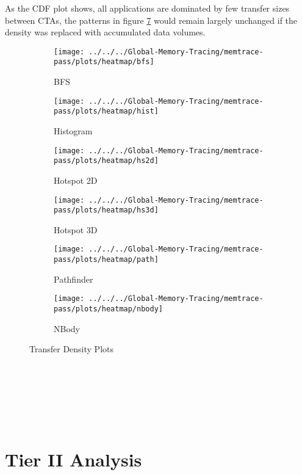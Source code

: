 As the CDF plot shows, all applications are dominated by few transfer sizes between CTAs, the patterns in figure \ref{fig:density-plots} would remain largely unchanged if the density was replaced with accumulated data volumes.
\begin{figure}[h!]
	\begin{subfigure}[b]{0.45\textwidth}
		\texttt{[image: ../../../Global-Memory-Tracing/memtrace-pass/plots/heatmap/bfs]}
		\caption{BFS}
		\label{fig:density-bfs}
	\end{subfigure}
	\begin{subfigure}[b]{0.45\textwidth}
		\texttt{[image: ../../../Global-Memory-Tracing/memtrace-pass/plots/heatmap/hist]}
		\caption{Histogram}
		\label{fig:density-hist}
	\end{subfigure}
	\begin{subfigure}[b]{0.45\textwidth}
		\texttt{[image: ../../../Global-Memory-Tracing/memtrace-pass/plots/heatmap/hs2d]}
		\caption{Hotspot 2D}
		\label{fig:density-hs2d}
	\end{subfigure}
	\begin{subfigure}[b]{0.45\textwidth}
		\texttt{[image: ../../../Global-Memory-Tracing/memtrace-pass/plots/heatmap/hs3d]}
		\caption{Hotspot 3D}
		\label{fig:density-hs3d}
	\end{subfigure}
	\begin{subfigure}[b]{0.45\textwidth}
		\texttt{[image: ../../../Global-Memory-Tracing/memtrace-pass/plots/heatmap/path]}
		\caption{Pathfinder}
		\label{fig:density-path}
	\end{subfigure}
	\hfill
	\begin{subfigure}[b]{0.45\textwidth}
		\texttt{[image: ../../../Global-Memory-Tracing/memtrace-pass/plots/heatmap/nbody]}
		\caption{NBody}
		\label{fig:density-nbody}
	\end{subfigure}
	\caption{Transfer Density Plots}
	\label{fig:density-plots}
\end{figure}
\\\\\\\\\
\section{Tier II Analysis}
